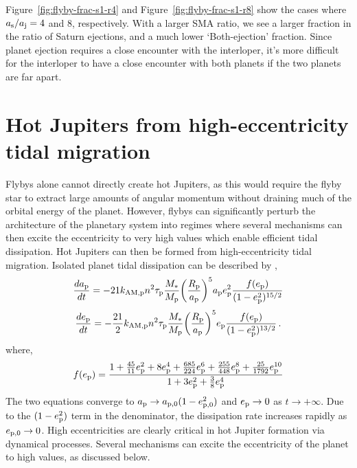 \documentclass[twocolumn]{aastex63}
\newcommand*\fgr[1]{Figure~\ref{#1}}
\begin{document}
\fgr{fig:flyby-frac-s1-r4} and \fgr{fig:flyby-frac-s1-r8} show the cases where $a_{\rm s}/a_{\rm j}=4$ and 8, respectively. With a larger SMA ratio, we see a larger fraction in the ratio of Saturn ejections,  and a much lower `Both-ejection' fraction. Since planet ejection requires a close encounter with the interloper, it's more difficult for the interloper to have a close encounter with both planets if the two planets are far apart.


\section{Hot Jupiters from high-eccentricity tidal migration}
Flybys alone cannot directly create hot Jupiters, as this would require the flyby star to extract large amounts of angular momentum without draining much of the orbital energy of the planet. However, flybys can significantly perturb the architecture of the planetary system into regimes where several mechanisms can then excite the eccentricity to very high values which enable efficient tidal dissipation. Hot Jupiters can then be formed from high-eccentricity tidal migration. Isolated planet tidal dissipation can be described by \citep[e.g.][]{murray99,samsing18,hamers18},
\begin{equation}
\frac{da_{\rm p}}{dt}=-21k_{\rm AM,p}n^2\tau_{\rm p }\frac{M_{*}}{M_{\rm p}}\bigg(\frac{R_{\rm p }}{a_{\rm p}}\bigg)^5 a_{\rm p}e_{\rm p}^2\frac{f(e_{\rm p})}{(1-e_{\rm p}^2)^{15/2}}
\end{equation}
\begin{equation}
\frac{de_{\rm p}}{dt}=-\frac{21}{2}k_{\rm AM,p}n^2\tau_{\rm p }\frac{M_{*}}{M_{\rm p}}\bigg(\frac{R_{\rm p }}{a_{\rm p}}\bigg)^5 e_{\rm p}\frac{f(e_{\rm p})}{(1-e_{\rm p}^2)^{13/2}}\,.
\end{equation}
where,
\begin{equation}
f(e_{\rm p})=\frac{1+\frac{45}{11}e_{\rm p}^2+8e_{\rm p}^4 +\frac{685}{224}e_{\rm p}^6 +\frac{255}{448}e_{\rm p}^8+\frac{25}{1792}e_{\rm p}^{10}}{1+3e_{\rm p}^2 + \frac{3}{8}e_{\rm p}^4}
\end{equation}
The two equations converge to $a_{\rm p}\rightarrow a_{\rm p,0}(1-e_{\rm p,0}^2)$ and $e_{\rm p}\rightarrow 0$ as $t\rightarrow+\infty$. Due to the $(1-e_{\rm p}^2)$ term in the denominator, the dissipation rate increases rapidly as $e_{\rm p,0}\rightarrow 0$. High eccentricities are clearly critical in hot Jupiter formation via dynamical processes. Several  mechanisms can excite the eccentricity of the planet to high values, as discussed below.
\end{document}
